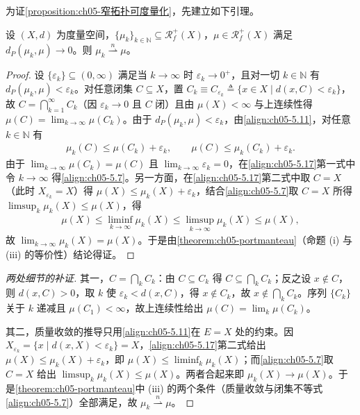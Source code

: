 \documentclass[../../main.tex]{subfiles}%
\begin{document}
为证\cref{proposition:ch05-窄拓扑可度量化}，先建立如下引理。

\begin{lemma}\label{lemma:ch05-Prokhorov到窄}
设 $(X,d)$ 为度量空间，$\{\mu_k\}_{k\in\mathbb{N}}\subseteq\mathscr{R}^+_f(X)$，$\mu\in\mathscr{R}^+_f(X)$ 满足 $d_P(\mu_k,\mu)\to0$。则 $\mu_k\stackrel{n}{\rightharpoonup}\mu$。
\end{lemma}

\begin{proof}
设 $\{\varepsilon_k\}\subseteq(0,\infty)$ 满足当 $k\to\infty$ 时 $\varepsilon_k\to0^+$，且对一切 $k\in\mathbb{N}$ 有 $d_P(\mu_k,\mu)<\varepsilon_k$。对任意闭集 $C\subseteq X$，置 $C_k\equiv C_{\varepsilon_k}\triangleq \{x\in X\mid d(x,C)<\varepsilon_k\}$，故 $C=\bigcap_{k=1}^\infty C_k$（因 $\varepsilon_k\to0$ 且 $C$ 闭）且由 $\mu(X)<\infty$ 与上连续性得 $\mu(C)=\lim_{k\to\infty}\mu(C_k)$。由于 $d_P(\mu_k,\mu)<\varepsilon_k$，由\eqref{align:ch05-5.11}，对任意 $k\in\mathbb{N}$ 有
\begin{align}
\mu_k(C)\leqslant\mu(C_k)+\varepsilon_k,\qquad
\mu(C)\leqslant\mu_k(C_k)+\varepsilon_k.\label{align:ch05-5.17}
\end{align}
由于 $\lim_{k\to\infty}\mu(C_k)=\mu(C)$ 且 $\lim_{k\to\infty}\varepsilon_k=0$，在\eqref{align:ch05-5.17}第一式中令 $k\to\infty$ 得\eqref{align:ch05-5.7}。另一方面，在\eqref{align:ch05-5.17}第二式中取 $C=X$（此时 $X_{\varepsilon_k}=X$）得 $\mu(X)\leqslant\mu_k(X)+\varepsilon_k$，结合\eqref{align:ch05-5.7}取 $C=X$ 所得 $\limsup_k\mu_k(X)\leqslant\mu(X)$，得
\begin{align*}
\mu(X)\leqslant\liminf_{k\to\infty}\mu_k(X)\leqslant\limsup_{k\to\infty}\mu_k(X)\leqslant\mu(X),
\end{align*}
故 $\lim_{k\to\infty}\mu_k(X)=\mu(X)$。于是由\cref{theorem:ch05-portmanteau}（命题 (i) 与 (iii) 的等价性）结论得证。
\end{proof}

\begin{proof}[两处细节的补证]
其一，$C=\bigcap_kC_k$：由 $C\subseteq C_k$ 得 $C\subseteq\bigcap_kC_k$；反之设 $x\notin C$，则 $d(x,C)>0$，取 $k$ 使 $\varepsilon_k<d(x,C)$，得 $x\notin C_k$，故 $x\notin\bigcap_kC_k$。序列 $\{C_k\}$ 关于 $k$ 递减且 $\mu(C_1)<\infty$，故上连续性给出 $\mu(C)=\lim_k\mu(C_k)$。

其二，质量收敛的推导只用\eqref{align:ch05-5.11}在 $E=X$ 处的约束。因 $X_{\varepsilon_k}=\{x\mid d(x,X)<\varepsilon_k\}=X$，\eqref{align:ch05-5.17}第二式给出 $\mu(X)\leqslant\mu_k(X)+\varepsilon_k$，即 $\mu(X)\leqslant\liminf_k\mu_k(X)$；而\eqref{align:ch05-5.7}取 $C=X$ 给出 $\limsup_k\mu_k(X)\leqslant\mu(X)$。两者合起来即 $\mu_k(X)\to\mu(X)$。于是\cref{theorem:ch05-portmanteau}中 (iii) 的两个条件（质量收敛与闭集不等式\eqref{align:ch05-5.7}）全部满足，故 $\mu_k\stackrel{n}{\rightharpoonup}\mu$。
\end{proof}
\end{document}
